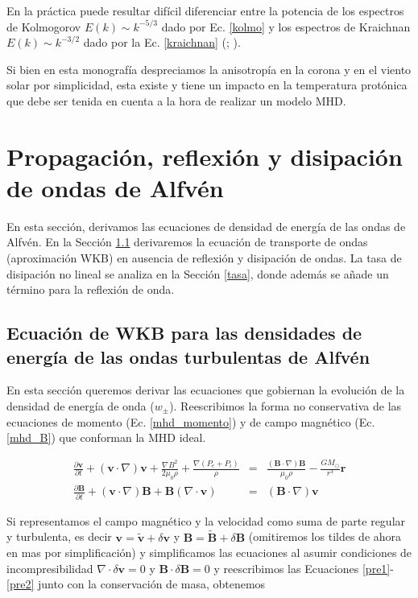 \documentclass[a4paper,11pt]{report}
\begin{document}
En la práctica puede resultar difícil diferenciar entre la potencia de los espectros de Kolmogorov $E(k)\sim k^{-5/3}$ dado por Ec. \ref{kolmo} y los espectros de Kraichnan $E(k)\sim k^{-3/2}$ dado por la Ec. \ref{kraichnan} (\citet{saddoughi_1994}; \citet{bruno_2005}).

Si bien en esta monografía despreciamos la anisotropía en la corona y en el viento solar por simplicidad, esta existe y tiene un impacto en la temperatura protónica \citep{vasquez_2003} que debe ser tenida en cuenta a la hora de realizar un modelo MHD.



\chapter{Propagación, reflexión y disipación de ondas de Alfvén}\label{propagacion}
En esta sección, derivamos las ecuaciones de densidad de energía de las ondas de Alfvén. En la Sección \ref{wkb} derivaremos la ecuación de transporte de ondas (aproximación WKB) en ausencia de reflexión y disipación de ondas. La tasa de disipación no lineal se analiza en la Sección \ref{tasa}, donde además se añade un término para la reflexión de onda.


\section{Ecuación de WKB para las densidades de energía de las ondas turbulentas de Alfvén}\label{wkb}
En esta sección queremos derivar las ecuaciones que gobiernan la evolución de la densidad de energía de onda ($w_{\pm}$). Reescribimos la forma no conservativa de las ecuaciones de momento (Ec. \ref{mhd_momento}) y de campo magnético (Ec. \ref{mhd_B}) que conforman la MHD ideal.

\begin{eqnarray}
  \frac{\partial \boldsymbol{v}}{\partial t} + (\boldsymbol{v} \cdot \nabla) \boldsymbol{v} + \frac{\nabla B^2}{2\mu_0 \rho}+ \frac{\nabla (P_e +P_i)}{\rho} &=& \frac{(\boldsymbol{B} \cdot \nabla)\boldsymbol{B}}{\mu_0 \rho} -\frac{GM_{\odot}}{r^3}\boldsymbol{r} \label{pre1} \\
  \frac{\partial \boldsymbol{B}}{\partial t}+(\boldsymbol{v} \cdot \nabla )\boldsymbol{B} +\boldsymbol{B} (\nabla \cdot \boldsymbol{v}) &=& (\boldsymbol{B} \cdot \nabla)\boldsymbol{v} \label{pre2} 
\end{eqnarray}

Si representamos el campo magnético y la velocidad como suma de parte regular y turbulenta, es decir $\boldsymbol{v}=\tilde{\boldsymbol{v}}+ \delta \boldsymbol{v}$ y $\boldsymbol{B}=\tilde{\boldsymbol{B}}+ \delta \boldsymbol{B}$ (omitiremos los tildes de ahora en mas por simplificación) y simplificamos las ecuaciones al asumir condiciones de incompresibilidad $\nabla \cdot \delta \boldsymbol{v}=0$ y $ \boldsymbol{B}\cdot \delta \boldsymbol{B}=0$  y reescribimos las Ecuaciones \ref{pre1}-\ref{pre2} junto con la conservación de masa, obtenemos
\end{document}

